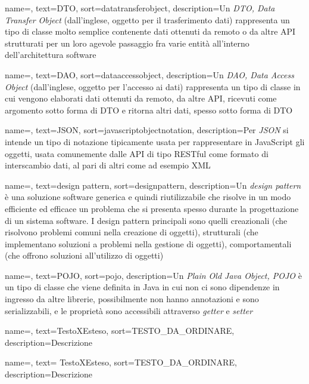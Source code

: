 {
    name=,
    text=DTO,
    sort=datatransferobject,
    description={Un \emph{DTO, Data Transfer Object} (dall'inglese, oggetto per il trasferimento dati) rappresenta un tipo di classe molto semplice contenente dati ottenuti da remoto o da altre API strutturati per un loro agevole passaggio fra varie entità all'interno dell'architettura software}
}

{
    name=,
    text=DAO,
    sort=dataaccessobject,
    description={Un \emph{DAO, Data Access Object} (dall'inglese, oggetto per l'accesso ai dati) rappresenta un tipo di classe in cui vengono elaborati dati ottenuti da remoto, da altre API, ricevuti come argomento sotto forma di DTO e ritorna altri dati, spesso sotto forma di DTO}
}

{
    name=,
    text=JSON,
    sort=javascriptobjectnotation,
    description={Per \emph{JSON} si intende un tipo di notazione tipicamente usata per rappresentare in JavaScript gli oggetti, usata comunemente dalle API di tipo RESTful come formato di interscambio dati, al pari di altri come ad esempio XML}
}

{
    name=,
    text=design pattern,
    sort=designpattern,
    description={Un \emph{design pattern} è una soluzione software generica e quindi riutilizzabile che risolve in un modo efficiente ed efficace un problema che si presenta spesso durante la progettazione di un sistema software. I design pattern principali sono quelli creazionali (che risolvono problemi comuni nella creazione di oggetti), strutturali (che implementano soluzioni a problemi nella gestione di oggetti), comportamentali (che offrono soluzioni all'utilizzo di oggetti)}
}

{
    name=,
    text=POJO,
    sort=pojo,
    description={Un \emph{Plain Old Java Object, POJO} è un tipo di classe che viene definita in Java in cui non ci sono dipendenze in ingresso da altre librerie, possibilmente non hanno annotazioni e sono serializzabili, e le proprietà sono accessibili attraverso \emph{getter} e \emph{setter}}
}



{
    name=,
    text=TestoXEsteso,
    sort=TESTO_DA_ORDINARE,
    description={Descrizione}
}

{
    name=,
    text= TestoXEsteso,
    sort=TESTO_DA_ORDINARE,
    description={Descrizione}
}